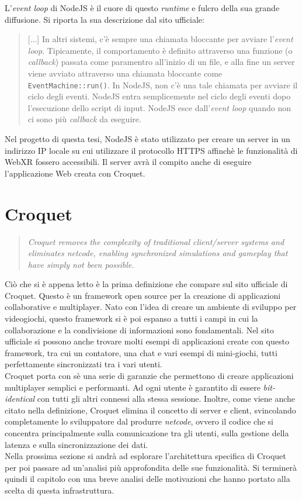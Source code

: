 L'\textit{event loop} di NodeJS è il cuore di questo \textit{runtime} e fulcro della sua grande diffusione. Si riporta la sua descrizione dal sito ufficiale\cite{NodeJS}:
\begin{quote}
    [...] In altri sistemi, c'è sempre una chiamata bloccante per avviare l'\textit{event loop}. Tipicamente, il comportamento è definito attraverso una funzione (o \textit{callback})
    passata come paramentro all'inizio di un file, e alla fine un server viene avviato attraverso una chiamata bloccante come \texttt{EventMachine::run()}. In NodeJS, non c'è una tale 
    chiamata per avviare il ciclo degli eventi. NodeJS entra semplicemente nel ciclo degli eventi dopo l'esecuzione dello script di input. NodeJS esce dall'\textit{event loop} quando 
    non ci sono più \textit{callback} da eseguire.
\end{quote}
Nel progetto di questa tesi, NodeJS è stato utilizzato per creare un server in un indirizzo IP locale su cui utilizzare il protocollo HTTPS affinchè le funzionalità di WebXR fossero
accessibili. Il server avrà il compito anche di eseguire l'applicazione Web creata con Croquet.


\section{Croquet}\label{sec:Croquet}
\begin{quote}
    \textit{Croquet removes the complexity of traditional client/server systems and eliminates netcode, enabling synchronized simulations and gameplay that have simply not been 
    possible.}\cite{Croquet}
\end{quote}
Ciò che si è appena letto è la prima definizione che compare sul sito ufficiale di Croquet. Questo è un framework open source per la creazione di applicazioni 
collaborative e multiplayer. Nato con l'idea di creare un ambiente di sviluppo per videogiochi, questo framework si è poi espanso a tutti i campi in cui la collaborazione e 
la condivisione di informazioni sono fondamentali. Nel sito ufficiale si possono anche trovare molti esempi di applicazioni create con questo framework, tra cui un contatore, una 
chat e vari esempi di mini-giochi, tutti perfettamente sincronizzati tra i vari utenti.\\
\newline
Croquet porta con sè una serie di garanzie che permettono di creare applicazioni multiplayer semplici e performanti. Ad ogni utente
è garantito di essere \textit{bit-identical} con tutti gli altri connessi alla stessa sessione. Inoltre, come viene anche citato nella definizione, Croquet elimina il concetto
di server e client, svincolando completamente lo sviluppatore dal produrre \textit{netcode}, ovvero il codice che si concentra principalmente sulla comunicazione tra gli utenti,
sulla gestione della latenza e sulla sincronizzazione dei dati.\\ 
Nella prossima sezione si andrà ad esplorare l'architettura specifica di Croquet per poi passare ad un'analisi più approfondita delle sue funzionalità. Si terminerà quindi il capitolo
con una breve analisi delle motivazioni che hanno portato alla scelta di questa infrastruttura.\\

